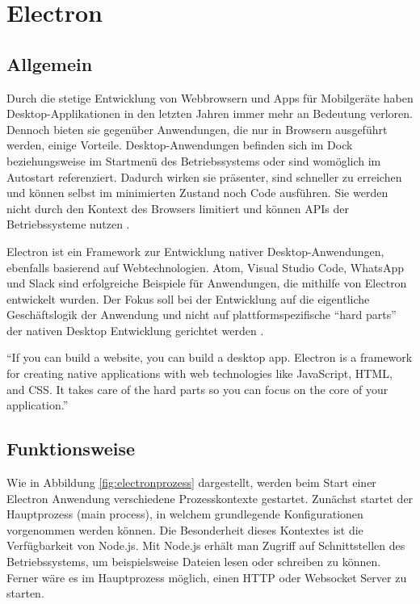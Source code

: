 \section{Electron}
\subsection{Allgemein}

Durch die stetige Entwicklung von Webbrowsern und Apps für Mobilgeräte haben Desktop-Applikationen in den letzten Jahren immer mehr an Bedeutung verloren.
Dennoch bieten sie gegenüber Anwendungen, die nur in Browsern ausgeführt werden, einige Vorteile.
Desktop-Anwendungen befinden sich im Dock beziehungsweise im Startmenü des Betriebssystems oder sind womöglich im Autostart referenziert.
Dadurch wirken sie präsenter, sind schneller zu erreichen und können selbst im minimierten Zustand noch Code ausführen.
Sie werden nicht durch den Kontext des Browsers limitiert und können APIs der Betriebssysteme nutzen \cite{Build58:online}.

Electron ist ein Framework zur Entwicklung nativer Desktop-Anwendungen, ebenfalls basierend auf Webtechnologien.
Atom, Visual Studio Code, WhatsApp und Slack sind erfolgreiche Beispiele für Anwendungen, die mithilfe von Electron
entwickelt wurden.
Der Fokus soll bei der Entwicklung auf die eigentliche Geschäftslogik der Anwendung und nicht auf plattformspezifische
``hard parts'' der nativen Desktop Entwicklung gerichtet werden \cite{Elect57:online}.

\vspace{0.3cm}
``If you can build a website, you can build a desktop app. Electron is a framework for creating native applications
with web technologies like JavaScript, HTML, and CSS. It takes care of the hard parts so you can focus on the core of
your application.''
\cite{Elect57:online}

\subsection{Funktionsweise}
\label{sec:functionsweise}


Wie in Abbildung \ref{fig:electronprozess} dargestellt, werden beim Start einer
Electron Anwendung verschiedene Prozesskontexte gestartet.
Zunächst startet der Hauptprozess (main process), in welchem grundlegende Konfigurationen vorgenommen werden können.
Die Besonderheit dieses Kontextes ist die Verfügbarkeit von Node.js.
Mit Node.js erhält man Zugriff auf Schnittstellen des Betriebssystems, um beispielsweise Dateien lesen oder schreiben zu können.
Ferner wäre es im Hauptprozess möglich, einen HTTP oder Websocket Server zu starten.

